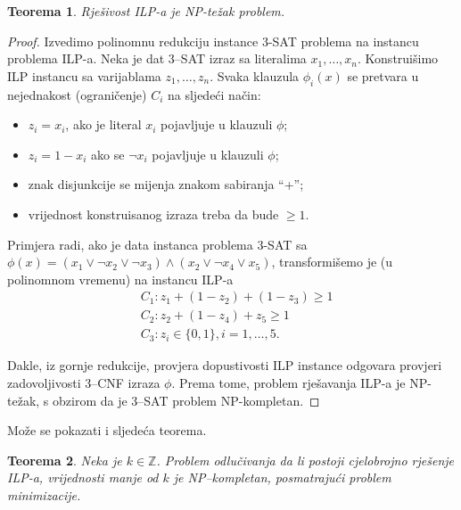 \documentclass[a4paper, utf8, 11pt, colorlinks]{book}
\newtheorem{thm}{Teorema}[chapter]
\theoremstyle{definition}
\begin{document}
   \begin{thm}
   	  Rješivost ILP-a je NP-težak problem.
   \end{thm}
   \begin{proof}
   	   Izvedimo polinomnu redukciju instance 3-SAT problema na instancu problema ILP-a. Neka je dat 3--SAT izraz sa literalima  
   	   $x_1,\ldots, x_n$.  Konstruišimo ILP instancu sa varijablama $z_1, \ldots, z_n$.
   	   Svaka klauzula $\phi_i(x)$ se pretvara u nejednakost (ograničenje)  $C_i$ na sljedeći način:
   	   \begin{itemize}
   	   	\item $z_i = x_i$, ako je literal $x_i$ pojavljuje u klauzuli $\phi$; 
   	   	\item $z_i = 1 - x_i$ ako se $\neg x_i$ pojavljuje u klauzuli $\phi$;
   	   	\item znak disjunkcije se mijenja znakom sabiranja ``+'';
   	   	\item vrijednost konstruisanog izraza treba da bude $\geq 1$. 
   	   \end{itemize}
   	   	       Primjera radi, ako je data instanca problema 3-SAT sa 
   	   	      $\phi(x) = (x_1 \vee \neg x_2 \vee \neg x_3) \wedge ( x_2 \vee \neg x_4 \vee x_5 )$, transformišemo je (u polinomnom vremenu) na instancu ILP-a
   	   	      \begin{align*}
   	   	         	 &C_1: z_1 + (1- z_2) + (1 - z_3 ) \geq 1 \\
   	   	         	 &C_2: z_2 + (1-z_4)  + z_5 \geq 1 \\
   	   	         	 &C_3: z_i \in \{0,1\}, i=1,\ldots,5.
   	   	      \end{align*} 

   	   Dakle, iz gornje redukcije,  provjera dopustivosti ILP instance odgovara provjeri zadovoljivosti 3--CNF izraza $\phi$.   Prema tome, problem rješavanja ILP-a je NP-težak, s obzirom da je 3--SAT problem NP-kompletan. 
   \end{proof} 
 Može se pokazati i sljedeća teorema.
 \begin{thm} Neka je $k\in \mathbb{Z}$.
 	 Problem odlučivanja da li postoji cjelobrojno rješenje  ILP-a,  vrijednosti manje od $k$ je NP--kompletan, posmatrajući problem minimizacije. 
 \end{thm}
 
\end{document}
